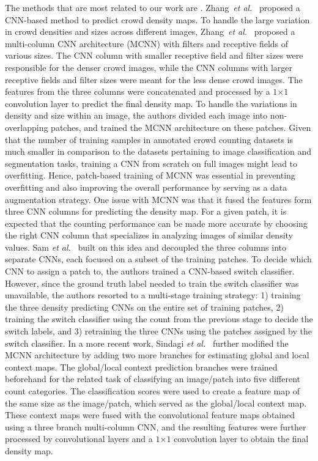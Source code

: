 \documentclass[runningheads]{llncs}
\begin{document}
The methods that are most related to our work are \cite{zhang2016single,sam2017switching,sindagi2017generating}. Zhang~\textit{et al.}~\cite{zhang2016single} proposed a CNN-based method to predict crowd density maps. To handle the large variation in crowd densities and sizes across different images,  Zhang~\textit{et al.}~\cite{zhang2016single} proposed a multi-column CNN architecture (MCNN) with filters and receptive fields of various sizes. The CNN column with smaller receptive field and filter sizes were responsible for the denser crowd images, while the CNN columns with larger receptive fields and filter sizes were meant for the less dense crowd images. The features from the three columns were concatenated and processed by a \mbox{$1$$\times$$1$} convolution layer to predict the final density map. To handle the variations in density and size within an image, the authors divided each image into non-overlapping patches, and trained the MCNN architecture on these patches. 
Given that the number of training samples in annotated crowd counting datasets is much smaller in comparison to the datasets pertaining to image classification and segmentation tasks, training a CNN from scratch on full images might lead to overfitting. Hence, patch-based training of MCNN was essential in preventing overfitting and also improving the overall  performance by serving as a data augmentation strategy. One issue with MCNN was that it fused the features form three CNN columns for predicting the density map. For a given patch, it is expected that the counting performance can be made more accurate by choosing the right CNN column that specializes in analyzing images of similar density values. 
Sam \textit{et al.}~\cite{sam2017switching} built on this idea and decoupled the three columns into separate CNNs, each focused on a subset of the training patches. To decide which CNN to assign a patch to, the authors trained a CNN-based switch classifier. However, since the ground truth label needed to train the switch classifier was unavailable, the authors resorted to a multi-stage training strategy: 1) training the three density predicting CNNs on the entire set of training patches, 2) training the switch classifier using the count from the previous stage to decide the switch labels, and 3) retraining the three CNNs using the patches assigned by the switch classifier.
In a more recent work, Sindagi \textit{et al.}~\cite{sindagi2017generating} further modified the MCNN architecture by adding two more branches for estimating global and local context maps. The global/local context prediction branches were trained beforehand for the related task of classifying an image/patch into five different count categories. The classification scores were used to create a feature map of the same size as the image/patch, which served as the global/local context map. These context maps were fused with the convolutional feature maps obtained using a three branch multi-column CNN, and the resulting features were further processed by convolutional layers and a $1$$\times$$1$ convolution layer to obtain the final density map.
\end{document}
